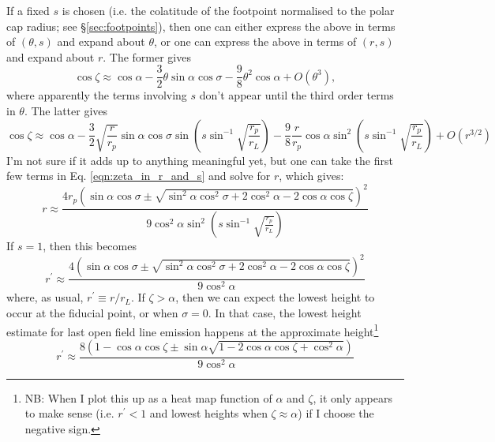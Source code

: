 \documentclass{book}
\begin{document}
If a fixed $s$ is chosen (i.e. the colatitude of the footpoint normalised to the polar cap radius; see \S\ref{sec:footpoints}), then one can either express the above in terms of $(\theta,s)$ and expand about $\theta$, or one can express the above in terms of $(r,s)$ and expand about $r$.
The former gives
\begin{equation}
    \cos\zeta \approx \cos\alpha - \frac32\theta\sin\alpha\cos\sigma - \frac98\theta^2\cos\alpha + O(\theta^3),
\end{equation}
where apparently the terms involving $s$ don't appear until the third order terms in $\theta$.
The latter gives
\begin{equation}
    \cos\zeta \approx
        \cos\alpha -
        \frac32\sqrt{\frac{r}{r_p}}\sin\alpha\cos\sigma\sin\left(s\sin^{-1}\sqrt{\frac{r_p}{r_L}}\right) -
        \frac98\frac{r}{r_p}\cos\alpha\sin^2\left(s\sin^{-1}\sqrt{\frac{r_p}{r_L}}\right) +
        O(r^{3/2})
    \label{eqn:zeta_in_r_and_s}
\end{equation}
I'm not sure if it adds up to anything meaningful yet, but one can take the first few terms in Eq. \eqref{eqn:zeta_in_r_and_s} and solve for $r$, which gives:
\begin{equation}
    r \approx \frac{4r_p\left(\sin\alpha\cos\sigma \pm \sqrt{\sin^2\alpha\cos^2\sigma + 2\cos^2\alpha - 2\cos\alpha\cos\zeta}\right)^2}{
        9\cos^2\alpha\sin^2\left(s\sin^{-1}\sqrt{\frac{r_p}{r_L}}\right)}
\end{equation}
If $s=1$, then this becomes
\begin{equation}
    r^\prime \approx \frac{4\left(\sin\alpha\cos\sigma \pm \sqrt{\sin^2\alpha\cos^2\sigma + 2\cos^2\alpha - 2\cos\alpha\cos\zeta}\right)^2}{
        9\cos^2\alpha}
\end{equation}
where, as usual, $r^\prime \equiv r/r_L$.
If $\zeta > \alpha$, then we can expect the lowest height to occur at the fiducial point, or when $\sigma = 0$. In that case, the lowest height estimate for last open field line emission happens at the approximate height\footnote{NB: When I plot this up as a heat map function of $\alpha$ and $\zeta$, it only appears to make sense (i.e. $r^\prime < 1$ and lowest heights when $\zeta \approx \alpha$) if I choose the negative sign.}
\begin{equation}
    r^\prime \approx \frac{8\left(1 - \cos\alpha\cos\zeta \pm \sin\alpha\sqrt{1 - 2\cos\alpha\cos\zeta + \cos^2\alpha}\right)}{
        9\cos^2\alpha}
\end{equation}
\end{document}
